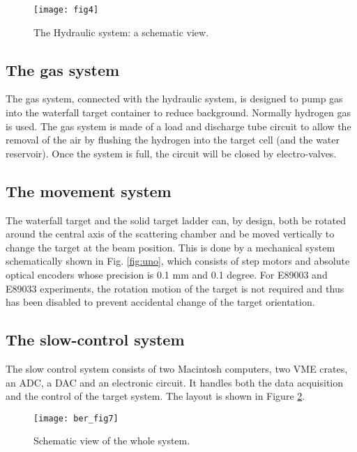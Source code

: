 \begin{figure}[htp]
\begin{center}
\texttt{[image: fig4]}
\caption[Waterfall Target: Hydraulic Schematic]{The Hydraulic system: a schematic view.}
\label{fig:acqua}
\end{center}
\end{figure}


\subsection{The gas system}

The gas system, connected with the hydraulic system,  
is designed to pump gas into the waterfall target container to reduce 
background. Normally hydrogen gas is used. The gas system is made of 
a load and discharge tube circuit to allow the removal of 
the air by flushing the hydrogen into the target cell (and the water 
reservoir). Once the system is full, the circuit will be
closed by electro-valves. 

\subsection{The movement system}

The waterfall target and the solid target ladder can, by design, both 
be rotated around the central axis of the scattering chamber 
and be moved vertically to change the target at the beam 
position. This is done by a mechanical system schematically shown in 
Fig. \ref{fig:uno}, which consists of step motors and absolute optical 
encoders whose precision is 0.1 mm and 0.1 degree.
For E89003 and E89033 experiments, the rotation motion of the target is not
required and thus has been disabled to prevent accidental change of the 
target orientation. 

\subsection{The slow-control system}

The slow control system consists of
two Macintosh computers, two VME crates, an ADC, a DAC and an electronic 
circuit. It handles both the data acquisition and the control of the target
system. The layout is shown in Figure \ref{fig:sette}.

\begin{figure}[htp]
\begin{center}
\texttt{[image: ber\_fig7]}
\caption[Waterfall Target: Schematic]{Schematic view of the whole system.}
\label{fig:sette}
\end{center}
\end{figure}

